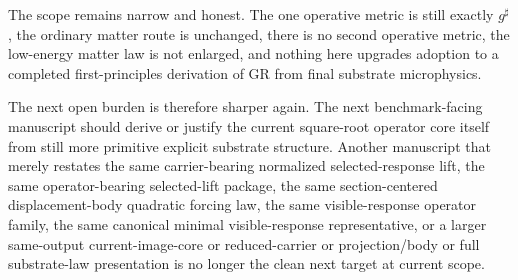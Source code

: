 \documentclass[11pt]{article}
\newcommand{\CompletedMetric}{g^{\sharp}}
\begin{document}
The scope remains narrow and honest. The one operative metric is still exactly \(\CompletedMetric\), the ordinary matter route is unchanged, there is no second operative metric, the low-energy matter law is not enlarged, and nothing here upgrades adoption to a completed first-principles derivation of GR from final substrate microphysics.

The next open burden is therefore sharper again. The next benchmark-facing manuscript should derive or justify the current square-root operator core itself from still more primitive explicit substrate structure. Another manuscript that merely restates the same carrier-bearing normalized selected-response lift, the same operator-bearing selected-lift package, the same section-centered displacement-body quadratic forcing law, the same visible-response operator family, the same canonical minimal visible-response representative, or a larger same-output current-image-core or reduced-carrier or projection/body or full substrate-law presentation is no longer the clean next target at current scope.
\end{document}
